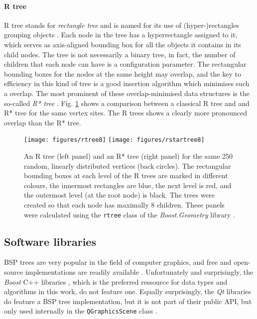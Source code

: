 \paragraph{R tree}
R tree stands for \textit{rectangle tree} and is named for its use of (hyper-)rectangles 
grouping objects \cite{wiki_rtree}.
Each node in the tree has a hyperrectangle assigned to it, which serves as axis-aligned bounding box
for all the objects it contains in its child nodes. 
The tree is not necessarily a binary tree, in fact, the number of children that each node can have is 
a configuration parameter. 
The rectangular bounding boxes for the nodes at the same height may overlap, and the key to efficiency 
in this kind of tree is a good insertion algorithm which minimises such a overlap.
The most prominent of these overlap-minimised data structures is the so-called \textit{R* tree} \cite{wiki_rstartree}.
Fig. \ref{fig:example_rtrees} shows a comparison between a classical R tree and and R* tree for the
same vertex sites. The R trees shows a clearly more pronounced overlap than the R* tree.

\begin{figure}[h]
	\begin{center}
		\texttt{[image: figures/rtree8]}
		\hspace{1cm}
		\texttt{[image: figures/rstartree8]}
	\end{center}
	\caption[Example R trees.]{An R tree (left panel) and an R* tree (right panel) for the 
		same 250 random, linearly distributed vertices (back circles). 
		The rectangular bounding boxes at each level of the R trees are marked in different colours, 
		the innermost rectangles are blue, the next level is red, and the outermost level 
		(at the root node) is black.
		The trees were created so that each node has maximally 8 children.
		These panels were calculated using the \lstinline[language=C++]|rtree| class \cite{web_boost_geometry_rtree}
		of the \textit{Boost.Geometry} library \cite{web_boost_geometry}.
		\label{fig:example_rtrees}}
\end{figure}


\subsection{Software libraries}
BSP trees are very popular in the field of computer graphics, and free and open-source implementations are 
readily available \cite{web_bsp_faq}. Unfortunately and surprisingly, the \textit{Boost} C++ libraries \cite{web_boost},
which is the preferred ressource for data types and algorithms in this work, do not feature one. 
Equally surprisingly, the \textit{Qt} libraries do feature a BSP tree implementation, but it is not part of 
their public API, but only used internally in the \lstinline[language=C++]|QGraphicsScene| class \cite{web_QGraphicsScene}.

